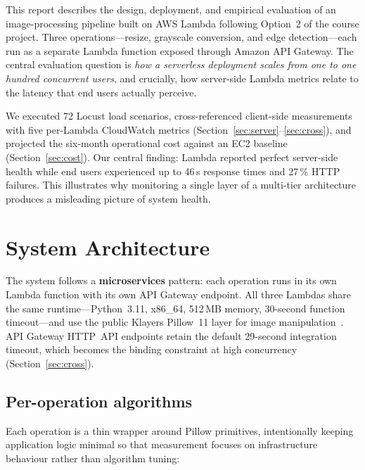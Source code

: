 \documentclass[10pt,twocolumn]{article}
\begin{document}
This report describes the design, deployment, and empirical evaluation of an
image-processing pipeline built on AWS Lambda following Option~2 of the course
project. Three operations---resize, grayscale conversion, and edge
detection---each run as a separate Lambda function exposed through Amazon API
Gateway. The central evaluation question is \textit{how a serverless deployment
scales from one to one hundred concurrent users}, and crucially, how server-side
Lambda metrics relate to the latency that end users actually perceive.

We executed 72 Locust load scenarios, cross-referenced client-side measurements
with five per-Lambda CloudWatch metrics (Section~\ref{sec:server}--\ref{sec:cross}),
and projected the six-month operational cost against an EC2 baseline
(Section~\ref{sec:cost}). Our central finding: Lambda reported perfect server-side health while end
users experienced up to 46\,s response times and 27\,\% HTTP failures. This
illustrates why monitoring a single layer of a multi-tier architecture
produces a misleading picture of system health.

\section{System Architecture}
\label{sec:arch}

The system follows a \textbf{microservices} pattern: each operation runs in its
own Lambda function with its own API Gateway endpoint. All three Lambdas share
the same runtime---Python~3.11, x86\_64, 512\,MB memory, 30-second function
timeout---and use the public Klayers Pillow~11 layer for image
manipulation~\cite{pillow:docs}. API Gateway HTTP~API endpoints retain the
default 29-second integration timeout, which becomes the binding constraint at
high concurrency (Section~\ref{sec:cross}).

\subsection{Per-operation algorithms}

Each operation is a thin wrapper around Pillow primitives, intentionally keeping
application logic minimal so that measurement focuses on infrastructure
behaviour rather than algorithm tuning:
\end{document}

